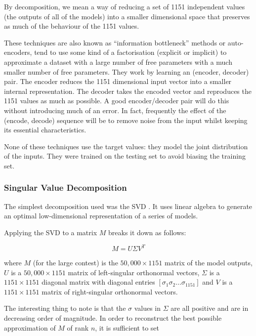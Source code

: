 \documentclass{article}
\begin{document}
By decomposition, we mean a way of reducing a set of 1151 independent values (the outputs of all of the models) into a smaller dimensional space that preserves as much of the behaviour of the 1151 values.

These techniques are also known as ``information bottleneck'' methods or auto-encoders, tend to use some kind of a factorisation (explicit or implicit) to approximate a dataset with a large number of free parameters with a much smaller number of free parameters.
They work by learning an (encoder, decoder) pair.  The encoder reduces the 1151 dimensional input vector into a smaller internal representation.  The decoder takes the encoded vector and reproduces the 1151 values as much as possible.  A good encoder/decoder pair will do this without introducing much of an error.  In fact, frequently the effect of the (encode, decode) sequence will be to remove noise from the input whilst keeping its essential characteristics.

None of these techniques use the target values: they model the joint distribution of the inputs.  
They were trained on the testing set to avoid biasing the training set.

\subsubsection{Singular Value Decomposition}

The simplest decomposition used was the SVD \cite{deerwester90}.  It uses linear algebra to generate an optimal low-dimensional representation of a series of models.

Applying the SVD to a matrix $M$ breaks it down as follows:

\begin{equation}
M = U \Sigma V^T
\end{equation}

where $M$ (for the large contest) is the $50,000 \times 1151$ matrix of the model outputs, $U$ is a $50,000 \times 1151$ matrix of left-singular orthonormal vectors, $\Sigma$ is a $1151 \times 1151$ diagonal matrix with diagonal entries $[ \sigma_1 \sigma_2 \ldots \sigma_{1151}]$ and $V$ is a $1151 \times 1151$ matrix of right-singular orthonormal vectors.

The interesting thing to note is that the $\sigma$ values in $\Sigma$ are all positive and are in decreasing order of magnitude.  In order to reconstruct the best possible approximation of $M$ of rank $n$, it is sufficient to set
\end{document}
